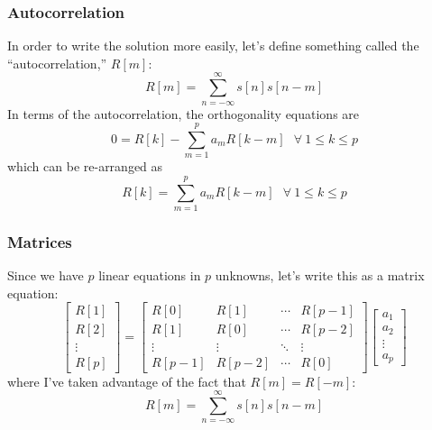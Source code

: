 \documentclass{beamer}
\begin{document}
\begin{frame}
  \frametitle{Autocorrelation}

  In order to write the solution more easily, let's define something
  called the ``autocorrelation,'' $R[m]$:
  \begin{displaymath}
    R[m] = \sum_{n=-\infty}^\infty s[n]s[n-m]
  \end{displaymath}
  In terms of the autocorrelation, the orthogonality equations are
  \begin{displaymath}
    0 = R[k] -\sum_{m=1}^pa_m R[k-m]~~~\forall~1\le k\le p
  \end{displaymath}
  which can be re-arranged as
  \begin{displaymath}
    R[k] = \sum_{m=1}^pa_m R[k-m]~~~\forall~1\le k\le p
  \end{displaymath}
\end{frame}

\begin{frame}
  \frametitle{Matrices}

  Since we have $p$ linear equations in $p$ unknowns, let's write this
  as a matrix equation:
  \begin{displaymath}
    \left[\begin{array}{c}R[1]\\ R[2]\\\vdots\\ R[p]\end{array}\right] =
    \left[\begin{array}{cccc} R[0] & R[1] &  \cdots & R[p-1] \\
        R[1] & R[0] & \cdots & R[p-2] \\
        \vdots & \vdots & \ddots & \vdots \\
        R[p-1] & R[p-2] & \cdots & R[0] \end{array}\right]
    \left[\begin{array}{c}a_1\\a_2\\\vdots\\a_p\end{array}\right]
  \end{displaymath}
  where I've taken advantage of the fact that $R[m]=R[-m]$:
  \begin{displaymath}
    R[m] = \sum_{n=-\infty}^\infty s[n]s[n-m]
  \end{displaymath}
\end{frame}
      
\end{document}
